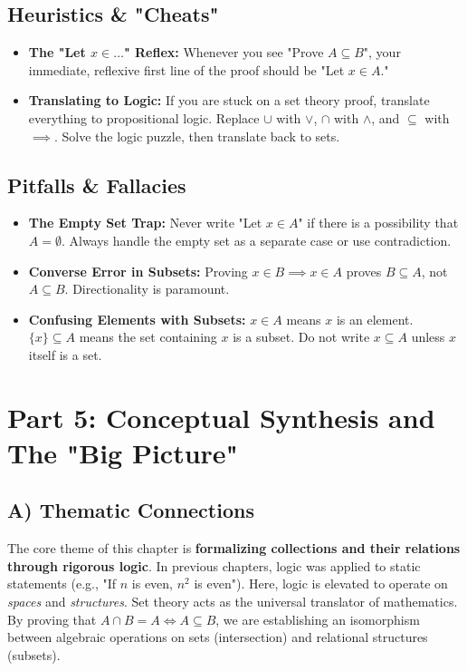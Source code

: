 \documentclass[11pt]{article}
\theoremstyle{definition}
\theoremstyle{remark}
\begin{document}
\subsection{Heuristics \& "Cheats"}
\begin{itemize}
    \item \textbf{The "Let $x \in \dots$" Reflex:} Whenever you see "Prove $A \subseteq B$", your immediate, reflexive first line of the proof should be "Let $x \in A$."
    \item \textbf{Translating to Logic:} If you are stuck on a set theory proof, translate everything to propositional logic. Replace $\cup$ with $\lor$, $\cap$ with $\land$, and $\subseteq$ with $\implies$. Solve the logic puzzle, then translate back to sets.
\end{itemize}

\subsection{Pitfalls \& Fallacies}
\begin{itemize}
    \item \textbf{The Empty Set Trap:} Never write "Let $x \in A$" if there is a possibility that $A = \emptyset$. Always handle the empty set as a separate case or use contradiction.
    \item \textbf{Converse Error in Subsets:} Proving $x \in B \implies x \in A$ proves $B \subseteq A$, not $A \subseteq B$. Directionality is paramount.
    \item \textbf{Confusing Elements with Subsets:} $x \in A$ means $x$ is an element. $\{x\} \subseteq A$ means the set containing $x$ is a subset. Do not write $x \subseteq A$ unless $x$ itself is a set.
\end{itemize}

\newpage
\section{Part 5: Conceptual Synthesis and The "Big Picture"}

\subsection{A) Thematic Connections}
The core theme of this chapter is \textbf{formalizing collections and their relations through rigorous logic}. In previous chapters, logic was applied to static statements (e.g., "If $n$ is even, $n^2$ is even"). Here, logic is elevated to operate on \textit{spaces} and \textit{structures}. Set theory acts as the universal translator of mathematics. By proving that $A \cap B = A \iff A \subseteq B$, we are establishing an isomorphism between algebraic operations on sets (intersection) and relational structures (subsets). 
\end{document}
